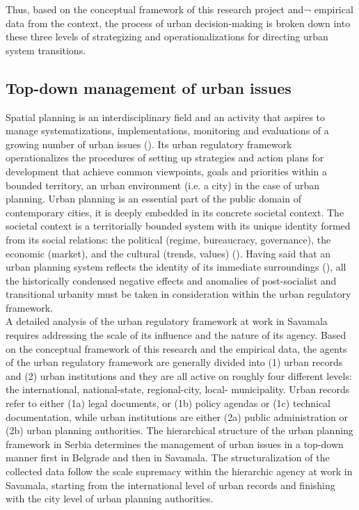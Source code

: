 \documentclass[11pt]{report}
\begin{document}
Thus, based on the conceptual framework of this research project and¬ empirical data from the context, the process of urban decision-making is broken down into these three levels of strategizing and operationalizations for directing urban system transitions. 

\subsection{Top-down management of urban issues}

Spatial planning is an interdisciplinary field and an activity that aspires to manage systematizations, implementations, monitoring and evaluations of a growing number of urban issues (\href{Fisher}{\citealt{fisher_building_2001}}). Its urban regulatory framework operationalizes the procedures of setting up strategies and action plans for development that achieve common viewpoints, goals and priorities within a bounded territory, an urban environment (i.e. a city) in the case of urban planning.
Urban planning is an essential part of the public domain of contemporary cities, it is deeply embedded in its concrete societal context. The societal context is a territorially bounded system with its unique identity formed from its social relations: the political (regime, bureaucracy, governance), the economic (market), and the cultural  (trends, values)  (\href{Vujosevic}{\citealt{vujosevic_planning_2006}}).
Having said that an urban planning system reflects the identity of its immediate surroundings (\href{Stojkov}{\citealt{stojkov_prostorno_2012}}),
all the historically condensed negative effects and anomalies of post-socialist and transitional urbanity must be taken in consideration within the urban regulatory framework.
\\

A detailed analysis of the urban regulatory framework at work in Savamala requires addressing the scale of its influence and the nature of its agency. Based on the conceptual framework of this research and the empirical data, the agents of the urban regulatory framework are generally divided into (1) urban records and (2) urban institutions and they are all active on roughly four different levels: the international, national-state, regional-city, local- municipality. Urban records refer to either (1a) legal documents, or (1b) policy agendas or (1c) technical documentation, while urban institutions are either (2a) public administration or (2b) urban planning authorities. The hierarchical structure of the urban planning framework in Serbia determines the management of urban issues in a top-down manner first in Belgrade and then in Savamala. The structuralization of the collected data follow the scale supremacy within the hierarchic agency at work in Savamala, starting from the international level of urban records and finishing with the city level of urban planning authorities.
\\
\end{document}
